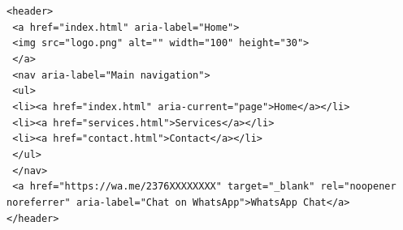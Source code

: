 \documentclass[11pt]{article}
\begin{document}
\begin{corrige}[Exercise 3]
\texttt{<header>}\\
\texttt{  <a href="index.html" aria-label="Home">}\\
\texttt{    <img src="logo.png" alt="" width="100" height="30">}\\
\texttt{  </a>}\\
\texttt{  <nav aria-label="Main navigation">}\\
\texttt{    <ul>}\\
\texttt{      <li><a href="index.html" aria-current="page">Home</a></li>}\\
\texttt{      <li><a href="services.html">Services</a></li>}\\
\texttt{      <li><a href="contact.html">Contact</a></li>}\\
\texttt{    </ul>}\\
\texttt{  </nav>}\\
\texttt{  <a href="https://wa.me/2376XXXXXXXX" target="\_blank" rel="noopener noreferrer" aria-label="Chat on WhatsApp">WhatsApp Chat</a>}\\
\texttt{</header>}
\end{corrige}
\end{document}
